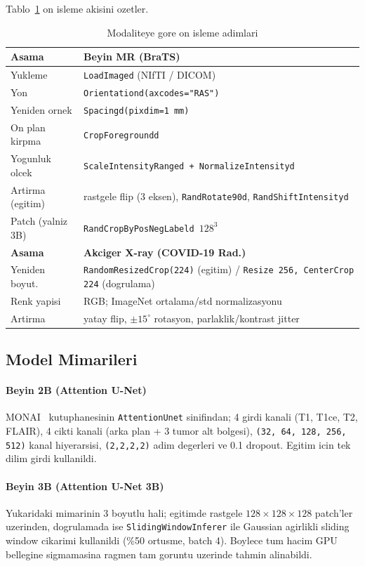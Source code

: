 \documentclass[conference]{IEEEtran}
\begin{document}
Tablo~\ref{tab:preprocess} on isleme akisini ozetler.

\begin{table}[!t]
\caption{Modaliteye gore on isleme adimlari}
\label{tab:preprocess}
\centering
\begin{tabularx}{\columnwidth}{l X}
\toprule
\textbf{Asama} & \textbf{Beyin MR (BraTS)} \\
\midrule
Yukleme        & \texttt{LoadImaged} (NIfTI / DICOM) \\
Yon            & \texttt{Orientationd(axcodes="RAS")} \\
Yeniden ornek  & \texttt{Spacingd(pixdim=1\,mm)} \\
On plan kirpma & \texttt{CropForegroundd} \\
Yogunluk olcek & \texttt{ScaleIntensityRanged + NormalizeIntensityd} \\
Artirma (egitim) & rastgele flip (3 eksen), \texttt{RandRotate90d}, \texttt{RandShiftIntensityd} \\
Patch (yalniz 3B) & \texttt{RandCropByPosNegLabeld $128^{3}$} \\
\midrule
\textbf{Asama} & \textbf{Akciger X-ray (COVID-19 Rad.)} \\
\midrule
Yeniden boyut. & \texttt{RandomResizedCrop(224)} (egitim) / \texttt{Resize 256, CenterCrop 224} (dogrulama) \\
Renk yapisi    & RGB; ImageNet ortalama/std normalizasyonu \\
Artirma        & yatay flip, $\pm 15^{\circ}$ rotasyon, parlaklik/kontrast jitter \\
\bottomrule
\end{tabularx}
\end{table}

\subsection{Model Mimarileri}

\paragraph{Beyin 2B (Attention U-Net)} MONAI~\cite{cardoso2022monai} kutuphanesinin
\texttt{AttentionUnet} sinifindan; 4 girdi kanali (T1, T1ce, T2, FLAIR), 4 cikti
kanali (arka plan + 3 tumor alt bolgesi), \texttt{(32, 64, 128, 256, 512)}
kanal hiyerarsisi, \texttt{(2,2,2,2)} adim degerleri ve 0.1 dropout. Egitim
icin tek dilim girdi kullanildi.

\paragraph{Beyin 3B (Attention U-Net 3B)} Yukaridaki mimarinin 3 boyutlu hali;
egitimde rastgele $128 \times 128 \times 128$ patch'ler uzerinden, dogrulamada
ise \texttt{SlidingWindowInferer} ile Gaussian agirlikli sliding window
cikarimi kullanildi (\%50 ortusme, batch 4). Boylece tum hacim GPU bellegine
sigmamasina ragmen tam goruntu uzerinde tahmin alinabildi.
\end{document}
